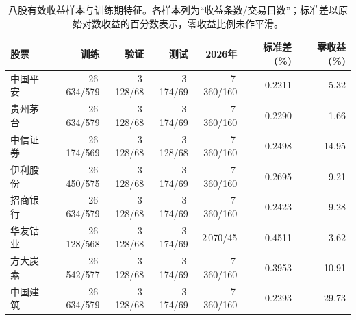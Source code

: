 \begin{table}[!htbp]\centering\small
\caption{八股有效收益样本与训练期特征。各样本列为“收益条数/交易日数”；标准差以原始对数收益的百分数表示，零收益比例未作平滑。}
\label{tab:eight_counts}
\begin{tabular}{lrrrrrr}\toprule
股票 & 训练 & 验证 & 测试 & 2026年 & 标准差(\%) & 零收益(\%)\\\midrule
中国平安 & 26\,634/579 & 3\,128/68 & 3\,174/69 & 7\,360/160 & 0.2211 & 5.32\\
贵州茅台 & 26\,634/579 & 3\,128/68 & 3\,174/69 & 7\,360/160 & 0.2290 & 1.66\\
中信证券 & 26\,174/569 & 3\,128/68 & 3\,128/68 & 7\,360/160 & 0.2498 & 14.95\\
伊利股份 & 26\,450/575 & 3\,128/68 & 3\,174/69 & 7\,360/160 & 0.2695 & 9.21\\
招商银行 & 26\,634/579 & 3\,128/68 & 3\,174/69 & 7\,360/160 & 0.2423 & 9.28\\
华友钴业 & 26\,128/568 & 3\,128/68 & 3\,174/69 & 2\,070/45 & 0.4511 & 3.62\\
方大炭素 & 26\,542/577 & 3\,128/68 & 3\,174/69 & 7\,360/160 & 0.3953 & 10.91\\
中国建筑 & 26\,634/579 & 3\,128/68 & 3\,174/69 & 7\,360/160 & 0.2293 & 29.73\\
\bottomrule\end{tabular}\end{table}
